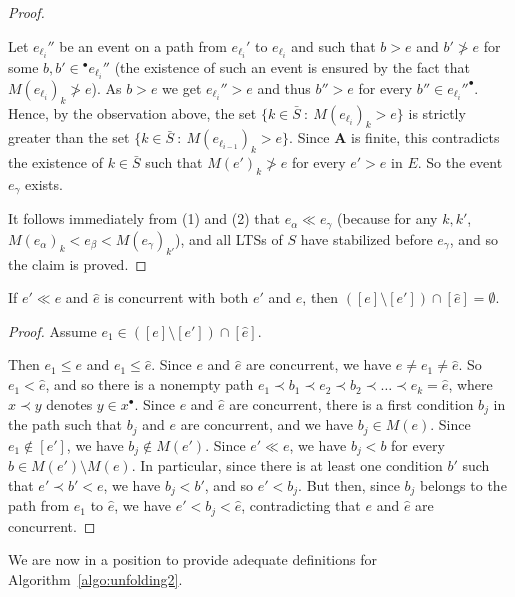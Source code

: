\documentclass{llncs}
\def\prod{\mathbf{A}}
\newcommand{\inp}[1]{{}^\bullet\!{#1}}
\newcommand{\out}[1]{{#1}^\bullet}
\def\scause{\ll}
\newcommand{\ma}[1]{M(#1)}
\begin{document}
\begin{proof}
\begin{itemize}
Let $e_{\ell_i}''$ be an event on a path from $e_{\ell_i}'$ to $e_{\ell_i}$ and such that 
$b>e$ and $b'\ngtr e$ for some $b,b'\in \inp{e_{\ell_i}''}$ (the existence of such an event is ensured by the fact that $M(e_{\ell_i})_k\ngtr e$).
As $b>e$ we get $e_{\ell_i}''>e$ and thus $b''>e$ for every $b''\in \out{e_{\ell_i}''}$.
Hence, by the observation above, the set $\{k\in\bar{S}~:~M(e_{\ell_i})_k>e\}$ is strictly greater than the set $\{k\in\bar{S}~:~M(e_{\ell_{i-1}})_k>e\}$.
Since $\prod$ is finite, this contradicts the existence of $k\in\bar{S}$ such that 
$M(e')_k\ngtr e$ for every $e'>e$ in $E$. So the event $e_\gamma$ exists.
\end{itemize}
It follows immediately from (1) and (2) that $e_{\alpha} \scause e_{\gamma}$ (because for any $k,k'$, $M(e_\alpha)_k<e_\beta<M(e_\gamma)_{k'}$), and all LTSs of $S$ have stabilized before $e_\gamma$, and so the claim is proved.
\end{proof}

\begin{lemma}
\label{lem:conc}
If $e' \scause e$ and $\hat{e}$ is concurrent with both $e'$ and $e$, then 
$([e] \setminus [e']) \cap [\hat{e}] = \emptyset$.
\end{lemma}

\begin{proof}
Assume $e_1 \in ([e] \setminus [e']) \cap [\hat{e}]$. 

Then $e_1 \leq e$ and $e_1 \leq \hat{e}$. Since $e$ and $\hat{e}$ are concurrent,
we have $e \neq e_1 \neq \hat{e}$. So $e_1 < \hat{e}$, and so
there is a nonempty path $e_1 \prec b_1 \prec e_2 \prec b_2 \prec \ldots \prec e_k = \hat{e}$,
where $x \prec y$ denotes $y \in \out{x}$. Since $e$ and $\hat{e}$ are concurrent, there is 
a first condition $b_j$ in the path such that $b_j$ and $e$ are concurrent, and we have
$b_j \in \ma{e}$. Since $e_1 \notin [e']$, we have $b_j \notin \ma{e'}$. Since
$e' \scause e$, we have $b_j < b$ for every $b \in \ma{e'} \setminus \ma{e}$. In
particular, since there is at least one condition $b'$ such that $e'\prec b' < e$,
we have $b_j < b'$, and so $e' < b_j$. But then, since $b_j$ belongs to the path 
from $e_1$ to $\hat{e}$, we have $e' < b_j < \hat{e}$, contradicting that 
$e$ and $\hat{e}$ are concurrent.
\end{proof}

We are now in a position to provide adequate definitions
for Algorithm~\ref{algo:unfolding2}.
\end{document}

